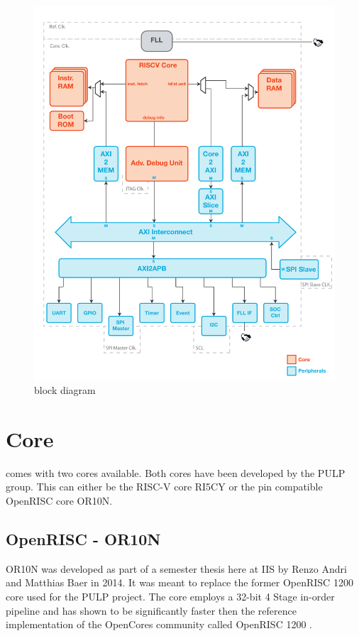 \begin{figure}[tbph]
  \centering
  \includegraphics[width=\linewidth]{./figures/pulpino_blockdiagram}
  \caption{\pulpino block diagram}
  \label{fig:block_diagram}
\end{figure}


\section{Core}

\pulpino comes with two cores available. Both cores have been developed by the PULP group. This can either be the RISC-V core RI5CY or the pin compatible OpenRISC core OR10N.

\subsection{OpenRISC - OR10N}

OR10N was developed as part of a semester thesis here at IIS by Renzo Andri and Matthias Baer in 2014. It was meant to replace the former OpenRISC 1200 core used for the PULP project. The core employs a 32-bit 4 Stage in-order pipeline and has shown to be significantly faster then the reference implementation of the OpenCores community called OpenRISC 1200 \cite{renzobaer}.

